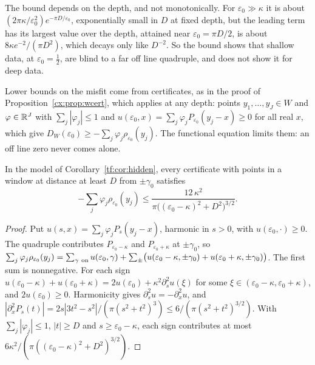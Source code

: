 The bound depends on the depth, and not monotonically. For $\varepsilon_0\gg\kappa$ it is about $(2\pi\kappa/\varepsilon_0^2)e^{-\pi D/\varepsilon_0}$, exponentially small in $D$ at fixed depth, but the leading term has its largest value over the depth, attained near $\varepsilon_0=\pi D/2$, is about $8\kappa e^{-2}/(\pi D^2)$, which decays only like $D^{-2}$. So the bound shows that shallow data, at $\varepsilon_0=\tfrac12$, are blind to a far off line quadruple, and does not show it for deep data.

Lower bounds on the misfit come from certificates, as in the proof of Proposition~\ref{cx:prop:wcert}, which applies at any depth: points $y_1,\dots,y_J\in W$ and $\varphi\in\mathbb{R}^J$ with $\sum_j|\varphi_j|\le1$ and $u(\varepsilon_0,x)=\sum_j\varphi_jP_{\varepsilon_0}(y_j-x)\ge0$ for all real $x$, which give $D_W(\varepsilon_0)\ge-\sum_j\varphi_j\rho_{\varepsilon_0}(y_j)$. The functional equation limits them: an off line zero never comes alone.

\begin{proposition}\label{tf:prop:ceiling}
In the model of Corollary~\ref{tf:cor:hidden}, every certificate with points in a window at distance at least $D$ from $\pm\gamma_0$ satisfies
\[
-\sum_j\varphi_j\rho_{\varepsilon_0}(y_j)\le\frac{12\,\kappa^2}{\pi\bigl((\varepsilon_0-\kappa)^2+D^2\bigr)^{3/2}}.
\]
\end{proposition}

\begin{proof}
Put $u(s,x)=\sum_j\varphi_jP_s(y_j-x)$, harmonic in $s>0$, with $u(\varepsilon_0,\cdot)\ge0$. The quadruple contributes $P_{\varepsilon_0-\kappa}$ and $P_{\varepsilon_0+\kappa}$ at $\pm\gamma_0$, so $\sum_j\varphi_j\rho_{\varepsilon_0}(y_j)=\sum_{\gamma\ {\rm on}}u(\varepsilon_0,\gamma)+\sum_\pm\bigl(u(\varepsilon_0-\kappa,\pm\gamma_0)+u(\varepsilon_0+\kappa,\pm\gamma_0)\bigr)$. The first sum is nonnegative. For each sign $u(\varepsilon_0-\kappa)+u(\varepsilon_0+\kappa)=2u(\varepsilon_0)+\kappa^2\partial_s^2u(\xi)$ for some $\xi\in(\varepsilon_0-\kappa,\varepsilon_0+\kappa)$, and $2u(\varepsilon_0)\ge0$. Harmonicity gives $\partial_s^2u=-\partial_x^2u$, and $|\partial_x^2P_s(t)|=2s|3t^2-s^2|/(\pi(s^2+t^2)^3)\le6/(\pi(s^2+t^2)^{3/2})$. With $\sum_j|\varphi_j|\le1$, $|t|\ge D$ and $s\ge\varepsilon_0-\kappa$, each sign contributes at most $6\kappa^2/(\pi((\varepsilon_0-\kappa)^2+D^2)^{3/2})$.
\end{proof}

